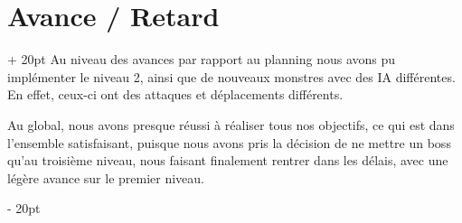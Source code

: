 \documentclass[a4paper, 12pt, twoside]{article}
\newcommand{\ind}[1][20pt]{\advance\leftskip + #1}
\newcommand{\deind}[1][20pt]{\advance\leftskip - #1}
\newenvironment{indt}[2][20pt]{#2 \par \ind[#1]}{\par \deind} %
\begin{document}
    \begin{indt}{\section{Avance / Retard}}
        Au niveau des avances par rapport au planning nous avons pu implémenter le niveau 2, ainsi que de nouveaux monstres avec des IA différentes. En effet, ceux-ci ont des attaques et déplacements différents.

        Au global, nous avons presque réussi à réaliser tous nos objectifs, ce qui est dans l'ensemble satisfaisant, puisque nous avons pris la décision de ne mettre un boss qu'au troisième niveau, nous faisant finalement rentrer dans les délais, avec une légère avance sur le premier niveau.

    \end{indt}

    \newpage
\end{document}
